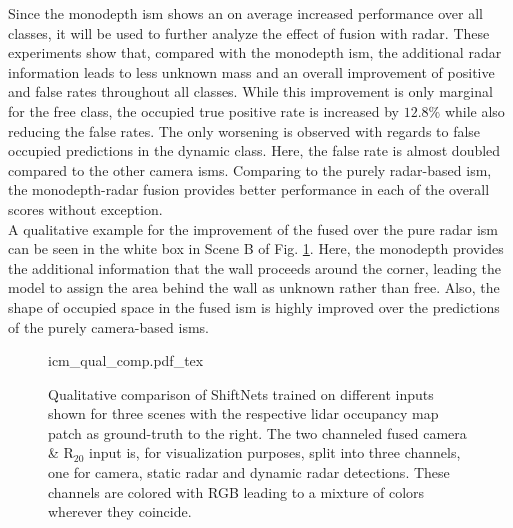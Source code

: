 Since the \gls{monodepth} \gls{ism} shows an on average increased performance over all classes, it will be used to further analyze the effect of fusion with radar. These experiments show that, compared with the \gls{monodepth} \gls{ism}, the additional radar information leads to less unknown mass and an overall improvement of positive and false rates throughout all classes. While this improvement is only marginal for the free class, the occupied true positive rate is increased by $12.8\%$ while also reducing the false rates. The only worsening is observed with regards to false occupied predictions in the dynamic class. Here, the false rate is almost doubled compared to the other camera \gls{ism}s. Comparing to the purely radar-based \gls{ism}, the \gls{monodepth}-radar fusion provides better performance in each of the overall scores without exception.\\ 
A qualitative example for the improvement of the fused over the pure radar \gls{ism} can be seen in the white box in Scene B of Fig. \ref{fig:icm_qual_comp}. Here, the \gls{monodepth} provides the additional information that the wall proceeds around the corner, leading the model to assign the area behind the wall as unknown rather than free. Also, the shape of occupied space in the fused \gls{ism} is highly improved over the predictions of the purely camera-based \gls{ism}s.
\begin{figure}[H]
\begin{center}
	{icm_qual_comp.pdf_tex}
	\caption{\label{fig:icm_qual_comp}Qualitative comparison of ShiftNets trained on different inputs shown for three scenes with the respective lidar occupancy map patch as ground-truth to the right. The two channeled fused camera \& R$_{20}$ input is, for visualization purposes, split into three channels, one for camera, static radar and dynamic radar detections. These channels are colored with RGB leading to a mixture of colors wherever they coincide.}
\end{center}
\end{figure}
%
